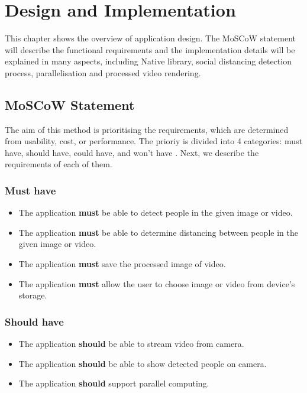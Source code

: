 \chapter{Design and Implementation}\label{implement}

    This chapter shows the overview of application design.
    The MoSCoW statement will describe the functional requirements and the implementation details will be explained in many aspects,
    including Native library, social distancing detection process, parallelisation and processed video rendering.

    \section{MoSCoW Statement}
        The aim of this method is prioritising the requirements,
        which are determined from usability, cost, or performance.
        The prioriy is divided into 4 categories: must have, should have, could have, and won't have \cite{8342602}.
        Next, we describe the requirements of each of them.

        \subsection{Must have}
            \begin{itemize}
                \setlength\itemsep{1em}
                \item The application \textbf{must} be able to detect people in the given image or video.
                \item The application \textbf{must} be able to determine distancing between people in the given image or video.
                \item The application \textbf{must} save the processed image of video.
                \item The application \textbf{must} allow the user to choose image or video from device's storage.
            \end{itemize}

        \subsection{Should have}
            \begin{itemize}
                \item The application \textbf{should} be able to stream video from camera.
                \item The application \textbf{should} be able to show detected people on camera.
                \item The application \textbf{should} support parallel computing.
            \end{itemize}

